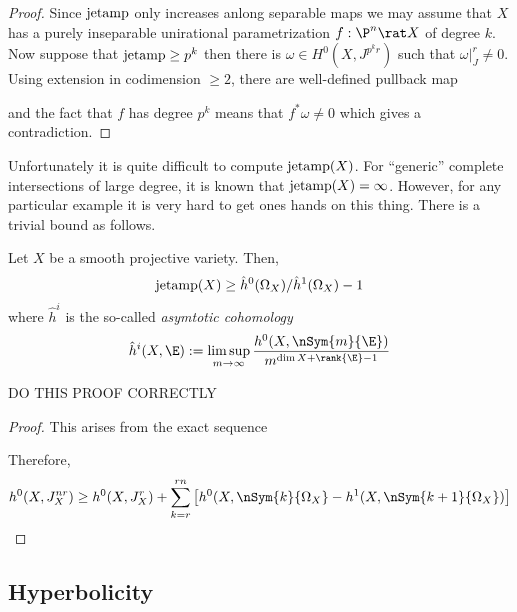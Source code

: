 \documentclass[12pt]{article}
\begin{document}
\begin{proof}
Since $\mathrm{jetamp}$ only increases anlong separable maps we may assume that $X$ has a purely inseparable unirational parametrization $f : \P^n \rat X$ of degree $k$. Now suppose that $\mathrm{jetamp} \ge p^k$ then there is $\omega \in H^0(X, J^{p^k r})$ such that $\omega|_J^{r} \neq 0$. Using extension in codimension $\ge 2$, there are well-defined pullback map
\begin{center}
\end{center} 
and the fact that $f$ has degree $p^k$ means that $f^* \omega \neq 0$ which gives a contradiction.
\end{proof}

Unfortunately it is quite difficult to compute $\mathrm{jetamp}(X)$. For ``generic'' complete intersections of large degree, it is known that $\mathrm{jetamp}(X) = \infty$. However, for any particular example it is very hard to get ones hands on this thing. There is a trivial bound as follows.

\begin{prop}
Let $X$ be a smooth projective variety. Then,
\[ \mathrm{jetamp}(X) \ge \hat{h}^0(\Omega_X) / \hat{h}^1(\Omega_X) - 1 \]
where $\hat{h}^i$ is the so-called \textit{asymtotic cohomology}
\[ \hat{h}^i(X, \E) := \limsup_{m \to \infty} \frac{h^0(X, \nSym{m}{\E})}{m^{\dim{X} + \rank{\E} - 1}} \]
\end{prop}

{\color{red} DO THIS PROOF CORRECTLY}

\begin{proof}
This arises from the exact sequence
\begin{center}
\end{center}
Therefore, 
\[ h^0(X, J^{nr}_X) \ge h^0(X, J^r_X) + \sum_{k = r}^{rn} \left[h^0(X, \nSym{k}{\Omega_X} -  h^1(X, \nSym{k+1}{\Omega_X}) \right] \]
\end{proof}

\subsection{Hyperbolicity}
\end{document}
